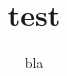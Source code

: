\documentclass[compress]{beamer}
\title{test}
\author{bla}
\begin{document}
  \begin{frame}
        \titlepage
  \end{frame}
\end{document}
